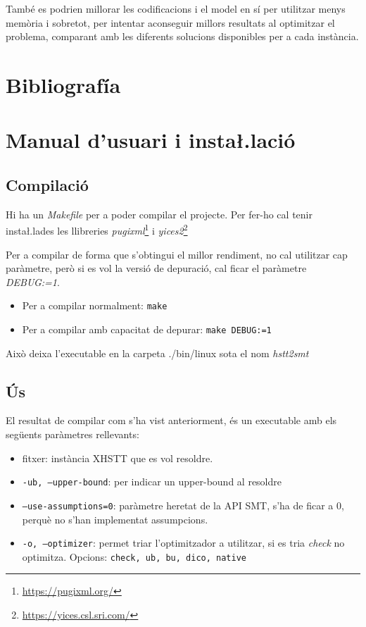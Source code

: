 \documentclass[11pt,a4paper,twoside]{report}
\begin{document}
  També es podrien millorar les codificacions i el model en sí per utilitzar menys memòria i sobretot, per intentar aconseguir millors resultats al optimitzar el problema, comparant amb les diferents solucions disponibles per a cada instància.

  \nocite{*}
  \chapter{Bibliografía}
  \printbibliography[heading=none]
  \chapter{Manual d'usuari i insta\l.lació}

  \section{Compilació}

  Hi ha un \textit{Makefile} per a poder compilar el projecte. Per fer-ho cal tenir insta\l.lades les llibreries \textit{pugixml}\footnote{\url{https://pugixml.org/}} i \textit{yices2}\footnote{\url{https://yices.csl.sri.com/}}
  
  Per a compilar de forma que s'obtingui el millor rendiment, no cal utilitzar cap paràmetre, però si es vol la versió de depuració, cal ficar el paràmetre \textit{DEBUG:=1}.
  \begin{center}
  \begin{itemize}
    \item Per a compilar normalment: \texttt{make}
    \item Per a compilar amb capacitat de depurar: \texttt{make DEBUG:=1}
  \end{itemize}
  \end{center}

  Això deixa l'executable en la carpeta ./bin/linux sota el nom \textit{hstt2smt}


  \section{Ús}
  
  El resultat de compilar com s'ha vist anteriorment, és un executable amb els següents paràmetres rellevants:
  \begin{itemize}
    \item fitxer: instància XHSTT que es vol resoldre.
    \item \texttt{-ub, --upper-bound}: per indicar un upper-bound al resoldre
    \item \texttt{--use-assumptions=0}: paràmetre heretat de la API SMT, s'ha de ficar a 0, perquè no s'han implementat assumpcions.
    \item \texttt{-o, --optimizer}: permet triar l'optimitzador a utilitzar, si es tria \textit{check} no optimitza. Opcions: \texttt{check, ub, bu, dico, native}
  \end{itemize}
\end{document}
